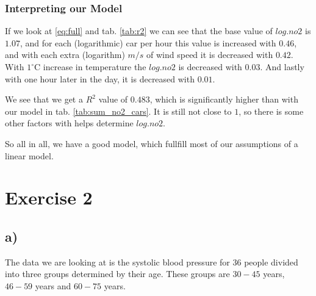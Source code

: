 \documentclass[a4paper,norsk, 10pt]{article}
\begin{document}
\subsubsection*{Interpreting our Model}
If we look at \eqref{eq:full} and tab. \ref{tab:r2} we can see that the base value of $log.no2$ is $1.07$, and for each (logarithmic) car per hour this value is increased with $0.46$, and with each extra (logarithm) $m/s$ of wind speed it is decreased with $0.42$. With $1^{\circ}$C increase in temperature the $log.no2$ is decreased with $0.03$. And lastly with one hour later in the day, it is decreased with $0.01$.

We see that we get a $R^2$ value of $0.483$, which is significantly higher than with our model in tab. \ref{tab:sum_no2_cars}. It is still not close to $1$, so there is some other factors with helps determine $log.no2$.

So all in all, we have a good model, which fullfill most of our assumptions of a linear model.





\section*{Exercise 2}

\subsection*{a)}

The data we are looking at is the systolic blood pressure for $36$ people divided into three groups determined by their age. These groups are $30-45$ years, $46-59$ years and $60-75$ years. 
\end{document}
